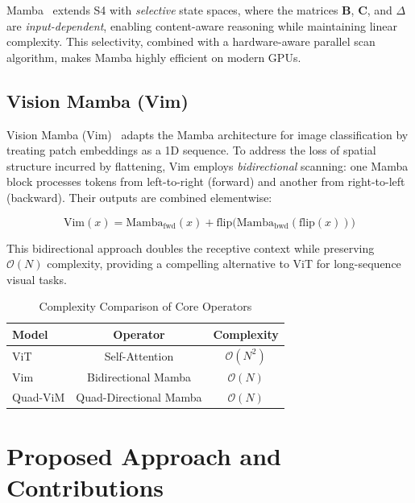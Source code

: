 \documentclass[conference]{IEEEtran}
\begin{document}
Mamba~\cite{gu2023mamba} extends S4 with \textit{selective} state spaces, where the matrices $\mathbf{B}$, $\mathbf{C}$, and $\Delta$ are \textit{input-dependent}, enabling content-aware reasoning while maintaining linear complexity. This selectivity, combined with a hardware-aware parallel scan algorithm, makes Mamba highly efficient on modern GPUs.

\subsection{Vision Mamba (Vim)}

Vision Mamba (Vim)~\cite{zhu2024vision} adapts the Mamba architecture for image classification by treating patch embeddings as a 1D sequence. To address the loss of spatial structure incurred by flattening, Vim employs \textit{bidirectional} scanning: one Mamba block processes tokens from left-to-right (forward) and another from right-to-left (backward). Their outputs are combined elementwise:

\begin{equation}
\text{Vim}(x) = \text{Mamba}_{\text{fwd}}(x) + \text{flip}\big(\text{Mamba}_{\text{bwd}}(\text{flip}(x))\big)
\label{eq:vim}
\end{equation}

This bidirectional approach doubles the receptive context while preserving $\mathcal{O}(N)$ complexity, providing a compelling alternative to ViT for long-sequence visual tasks.

\begin{table}[t]
\centering
\caption{Complexity Comparison of Core Operators}
\label{tab:complexity}
\begin{tabular}{lcc}
\toprule
\textbf{Model} & \textbf{Operator} & \textbf{Complexity} \\
\midrule
ViT   & Self-Attention & $\mathcal{O}(N^2)$ \\
Vim   & Bidirectional Mamba & $\mathcal{O}(N)$ \\
Quad-ViM & Quad-Directional Mamba & $\mathcal{O}(N)$ \\
\bottomrule
\end{tabular}
\end{table}

\section{Proposed Approach and Contributions}
\end{document}
